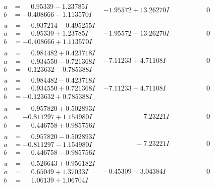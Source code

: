 \documentclass[1p]{elsarticle_modified}
\theoremstyle{definition}
\begin{document}
$$\begin{array}{c|c|c}
\begin{aligned}
a &= \phantom{-}0.95339 - 1.23785 I \\
b &= -0.408666 - 1.113570 I\end{aligned}
 & -1.95572 + 13.26270 I & \phantom{-0.000000 } 0 \\ \hline\begin{aligned}
u &= \phantom{-}0.937214 - 0.495255 I \\
a &= \phantom{-}0.95339 + 1.23785 I \\
b &= -0.408666 + 1.113570 I\end{aligned}
 & -1.95572 - 13.26270 I & \phantom{-0.000000 } 0 \\ \hline\begin{aligned}
u &= \phantom{-}0.984482 + 0.423718 I \\
a &= \phantom{-}0.934550 - 0.721368 I \\
b &= -0.123632 - 0.785388 I\end{aligned}
 & -7.11233 + 4.71108 I & \phantom{-0.000000 } 0 \\ \hline\begin{aligned}
u &= \phantom{-}0.984482 - 0.423718 I \\
a &= \phantom{-}0.934550 + 0.721368 I \\
b &= -0.123632 + 0.785388 I\end{aligned}
 & -7.11233 - 4.71108 I & \phantom{-0.000000 } 0 \\ \hline\begin{aligned}
u &= \phantom{-}0.957820 + 0.502893 I \\
a &= -0.811297 + 1.154980 I \\
b &= \phantom{-}0.446758 + 0.985756 I\end{aligned}
 & \phantom{-0.000000 -}7.23221 I & \phantom{-0.000000 } 0 \\ \hline\begin{aligned}
u &= \phantom{-}0.957820 - 0.502893 I \\
a &= -0.811297 - 1.154980 I \\
b &= \phantom{-}0.446758 - 0.985756 I\end{aligned}
 & \phantom{-0.000000 } -7.23221 I & \phantom{-0.000000 } 0 \\ \hline\begin{aligned}
u &= \phantom{-}0.526643 + 0.956182 I \\
a &= \phantom{-}0.65049 + 1.37033 I \\
b &= \phantom{-}1.06139 + 1.06704 I\end{aligned}
 & -0.45309 - 3.04384 I & \phantom{-0.000000 } 0 \\ \hline\begin{aligned}

\end{aligned}
\end{array}$$
\end{document}
